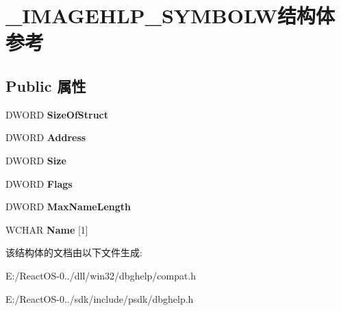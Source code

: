 \hypertarget{struct___i_m_a_g_e_h_l_p___s_y_m_b_o_l_w}{}\section{\+\_\+\+I\+M\+A\+G\+E\+H\+L\+P\+\_\+\+S\+Y\+M\+B\+O\+L\+W结构体 参考}
\label{struct___i_m_a_g_e_h_l_p___s_y_m_b_o_l_w}
\subsection*{Public 属性}
\begin{DoxyCompactItemize}
\item 
\mbox{\label{struct___i_m_a_g_e_h_l_p___s_y_m_b_o_l_w_ae75e6923c2fbfaedd3a1604404931c9b}} 
D\+W\+O\+RD {\bfseries Size\+Of\+Struct}
\item 
\mbox{\label{struct___i_m_a_g_e_h_l_p___s_y_m_b_o_l_w_ade9f7be7077cd2c56f6ea77e9852c47b}} 
D\+W\+O\+RD {\bfseries Address}
\item 
\mbox{\label{struct___i_m_a_g_e_h_l_p___s_y_m_b_o_l_w_a9959cafee449e61235e732aa6150eb64}} 
D\+W\+O\+RD {\bfseries Size}
\item 
\mbox{\label{struct___i_m_a_g_e_h_l_p___s_y_m_b_o_l_w_a1beac3663ad5f7550b1ed4ec2114ce02}} 
D\+W\+O\+RD {\bfseries Flags}
\item 
\mbox{\label{struct___i_m_a_g_e_h_l_p___s_y_m_b_o_l_w_a806d4d3d2c646d6c640548a00a7b0a7d}} 
D\+W\+O\+RD {\bfseries Max\+Name\+Length}
\item 
\mbox{\label{struct___i_m_a_g_e_h_l_p___s_y_m_b_o_l_w_afa6e54ab975e8d3bc9363eae8653f1ff}} 
W\+C\+H\+AR {\bfseries Name} \mbox{[}1\mbox{]}
\end{DoxyCompactItemize}


该结构体的文档由以下文件生成\+:\begin{DoxyCompactItemize}
\item 
E\+:/\+React\+O\+S-\/0../dll/win32/dbghelp/compat.\+h\item 
E\+:/\+React\+O\+S-\/0../sdk/include/psdk/dbghelp.\+h\end{DoxyCompactItemize}
